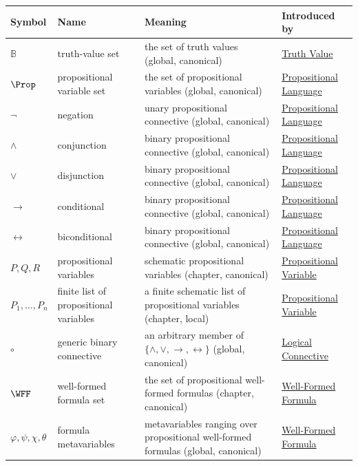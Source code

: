 \begin{longtable}{p{}p{}p{}p{}}
\textbf{Symbol} & \textbf{Name} & \textbf{Meaning} & \textbf{Introduced by}\\
\hline
\(\mathbb{B}\) & truth-value set & the set of truth values (global, canonical) & \hyperref[def:truth-value-propositional-logic]{Truth Value}\\
\(\Prop\) & propositional variable set & the set of propositional variables (global, canonical) & \hyperref[def:propositional-language]{Propositional Language}\\
\(\neg\) & negation & unary propositional connective (global, canonical) & \hyperref[def:propositional-language]{Propositional Language}\\
\(\land\) & conjunction & binary propositional connective (global, canonical) & \hyperref[def:propositional-language]{Propositional Language}\\
\(\lor\) & disjunction & binary propositional connective (global, canonical) & \hyperref[def:propositional-language]{Propositional Language}\\
\(\to\) & conditional & binary propositional connective (global, canonical) & \hyperref[def:propositional-language]{Propositional Language}\\
\(\leftrightarrow\) & biconditional & binary propositional connective (global, canonical) & \hyperref[def:propositional-language]{Propositional Language}\\
\(P,Q,R\) & propositional variables & schematic propositional variables (chapter, canonical) & \hyperref[def:propositional-variable]{Propositional Variable}\\
\(P_1,\ldots,P_n\) & finite list of propositional variables & a finite schematic list of propositional variables (chapter, local) & \hyperref[def:propositional-variable]{Propositional Variable}\\
\(\circ\) & generic binary connective & an arbitrary member of \(\{\land,\lor,\to,\leftrightarrow\}\) (global, canonical) & \hyperref[def:logical-connective]{Logical Connective}\\
\(\WFF\) & well-formed formula set & the set of propositional well-formed formulas (chapter, canonical) & \hyperref[def:well-formed-formula]{Well-Formed Formula}\\
\(\varphi,\psi,\chi,\theta\) & formula metavariables & metavariables ranging over propositional well-formed formulas (global, canonical) & \hyperref[def:well-formed-formula]{Well-Formed Formula}\\

\end{longtable}
